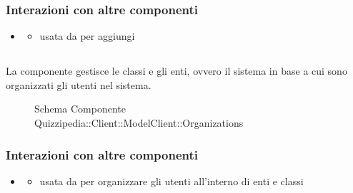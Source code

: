 \subsubsection{Interazioni con altre componenti}
\begin{itemize}
\item {}
\begin{itemize}
\item usata da  per aggiungi
\end{itemize}
\end{itemize}
\subsection{}
La componente gestisce le classi e gli enti, ovvero il sistema in base a cui sono organizzati gli utenti nel sistema.
\begin{figure}[H]
\centering
\noindent{}
\caption[Schema Componente Quizzipedia::Client::ModelClient::Organizations]{Schema Componente Quizzipedia::Client::ModelClient::Organizations}
\end{figure}
\subsubsection{Interazioni con altre componenti}
\begin{itemize}
\item {}
\begin{itemize}
\item usata da  per organizzare gli utenti all'interno di enti e classi
\end{itemize}
\end{itemize}
